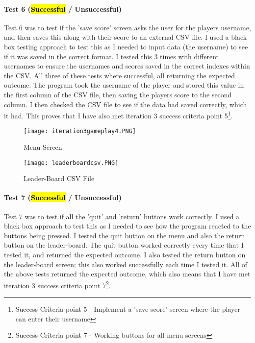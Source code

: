 \documentclass[12pt]{report}
\begin{document}
\paragraph{Test 6 (\hl{Successful} / Unsuccessful)}
Test 6 was to test if the 'save score' screen asks the user for the players username, and then saves this along with their score to an external CSV file. I used a black box testing approach to test this as I needed to input data (the username) to see if it was saved in the correct format. I tested this 3 times with different usernames to ensure the usernames and scores saved in the correct indexes within the CSV. All three of these tests where successful, all returning the expected outcome. The program took the username of the player and stored this value in the first column of the CSV file, then saving the players score to the second column. I then checked the CSV file to see if the data had saved correctly, which it had. This proves that I have also met iteration 3 success criteria point 5\footnote{Success Criteria point 5 - Implement a 'save score' screen where the player can enter their username}.

\begin{figure}[H]
    \centering
    \texttt{[image: iteration3gameplay4.PNG]}
    \caption{Menu Screen}
\end{figure}

\begin{figure}[H]
    \centering
    \texttt{[image: leaderboardcsv.PNG]}
    \caption{Leader-Board CSV File}
\end{figure}

\paragraph{Test 7 (\hl{Successful} / Unsuccessful)}
Test 7 was to test if all the 'quit' and 'return' buttons work correctly. I used a black box approach to test this as I needed to see how the program reacted to the buttons being pressed. I tested the quit button on the menu and also the return button on the leader-board. The quit button worked correctly every time that I tested it, and returned the expected outcome. I also tested the return button on the leader-board screen; this also worked successfully each time I tested it. All of the above tests returned the expected outcome, which also means that I have met iteration 3 success criteria point 7\footnote{Success Criteria point 7 - Working buttons for all menu screens}.
\end{document}
